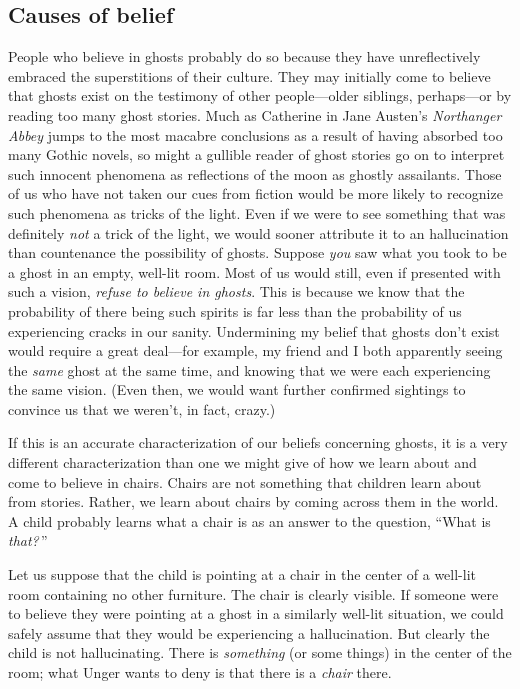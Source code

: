 \documentclass[11pt]{article}
\begin{document}
\begin{spacing}{1.5}
\subsection{Causes of belief}
\label{unger-cause}
People who believe in ghosts probably do so because they have
unreflectively embraced the superstitions of their culture.  They may
initially come to believe that ghosts exist on the testimony of other
people---older siblings, perhaps---or by reading too many ghost
stories.  Much as Catherine in Jane Austen's {\em Northanger Abbey}
jumps to the most macabre conclusions as a result of having absorbed
too many Gothic novels, so might a gullible reader of ghost stories go
on to interpret such innocent phenomena as reflections of the moon as
ghostly assailants.  Those of us who have not taken our cues from
fiction would be more likely to recognize such phenomena as tricks of
the light.  Even if we were to see something that was definitely {\em
  not} a trick of the light, we would sooner attribute it to an
hallucination than countenance the possibility of ghosts.  Suppose
{\em you} saw what you took to be a ghost in an empty, well-lit room.
Most of us would still, even if presented with such a vision, {\em
  refuse to believe in ghosts}.  This is because we know that the
probability of there being such spirits is far less than the
probability of us experiencing cracks in our sanity.  Undermining my
belief that ghosts don't exist would require a great deal---for
example, my friend and I both apparently seeing the {\em same} ghost
at the same time, and knowing that we were each experiencing the same
vision.  (Even then, we would want further confirmed sightings to
convince us that we weren't, in fact, crazy.)

If this is an accurate characterization of our beliefs concerning
ghosts, it is a very different characterization than one we might give
of how we learn about and come to believe in chairs.  Chairs are not
something that children learn about from stories.  Rather, we learn
about chairs by coming across them in the world.  A child probably
learns what a chair is as an answer to the question, ``What is {\em
  that?}\,''

Let us suppose that the child is pointing at a chair in the center of
a well-lit room containing no other furniture.  The chair is clearly
visible.  If someone were to believe they were pointing at a ghost in
a similarly well-lit situation, we could safely assume that they would
be experiencing a hallucination.  But clearly the child is not
hallucinating.  There is {\em something} (or some things) in the
center of the room; what Unger wants to deny is that there is a {\em
  chair} there.


\end{spacing}
\end{document}
